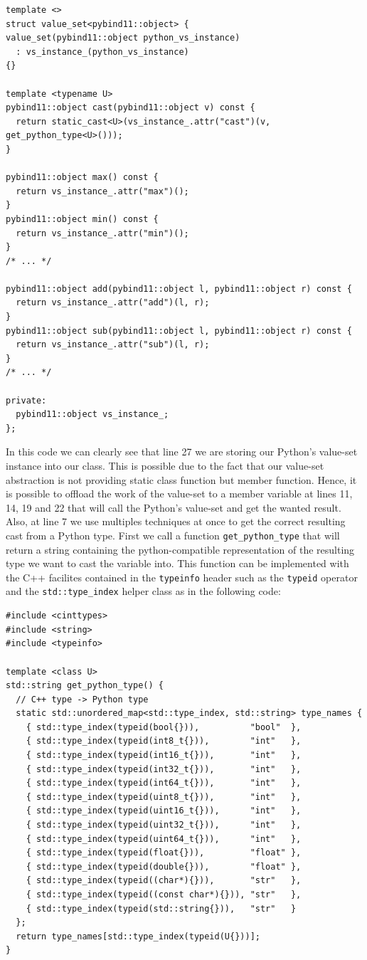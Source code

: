 \begin{verbatim}
template <>
struct value_set<pybind11::object> {
value_set(pybind11::object python_vs_instance)
  : vs_instance_(python_vs_instance)
{}

template <typename U>
pybind11::object cast(pybind11::object v) const {
  return static_cast<U>(vs_instance_.attr("cast")(v, get_python_type<U>()));
}

pybind11::object max() const {
  return vs_instance_.attr("max")();
}
pybind11::object min() const {
  return vs_instance_.attr("min")();
}
/* ... */

pybind11::object add(pybind11::object l, pybind11::object r) const {
  return vs_instance_.attr("add")(l, r);
}
pybind11::object sub(pybind11::object l, pybind11::object r) const {
  return vs_instance_.attr("sub")(l, r);
}
/* ... */

private:
  pybind11::object vs_instance_;
};
\end{verbatim}

In this code we can clearly see that line 27 we are storing our Python's value-set instance into our class. This is
possible due to the fact that our value-set abstraction is not providing static class function but member function.
Hence, it is possible to offload the work of the value-set to a member variable at lines 11, 14, 19 and 22 that will
call the Python's value-set and get the wanted result. Also, at line 7 we use multiples techniques at once to get the
correct resulting cast from a Python type. First we call a function \texttt{get\_python\_type} that will return a string
containing the python-compatible representation of the resulting type we want to cast the variable into. This function
can be implemented with the C++ facilites contained in the \texttt{typeinfo} header such as the \texttt{typeid} operator
and the \texttt{std::type\_index} helper class as in the following code:

\begin{verbatim}
#include <cinttypes>
#include <string>
#include <typeinfo>

template <class U>
std::string get_python_type() {
  // C++ type -> Python type
  static std::unordered_map<std::type_index, std::string> type_names {
    { std::type_index(typeid(bool{})),          "bool"  },
    { std::type_index(typeid(int8_t{})),        "int"   },
    { std::type_index(typeid(int16_t{})),       "int"   },
    { std::type_index(typeid(int32_t{})),       "int"   },
    { std::type_index(typeid(int64_t{})),       "int"   },
    { std::type_index(typeid(uint8_t{})),       "int"   },
    { std::type_index(typeid(uint16_t{})),      "int"   },
    { std::type_index(typeid(uint32_t{})),      "int"   },
    { std::type_index(typeid(uint64_t{})),      "int"   },
    { std::type_index(typeid(float{})),         "float" },
    { std::type_index(typeid(double{})),        "float" },
    { std::type_index(typeid((char*){})),       "str"   },
    { std::type_index(typeid((const char*){})), "str"   },
    { std::type_index(typeid(std::string{})),   "str"   }
  };
  return type_names[std::type_index(typeid(U{}))];
}
\end{verbatim}

